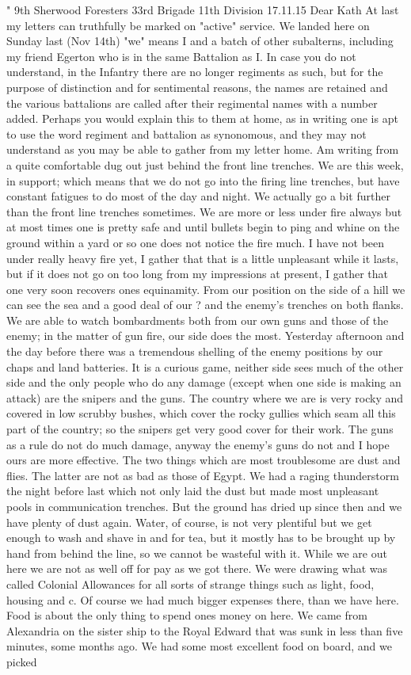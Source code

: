 " 9th Sherwood Foresters
    33rd Brigade
    11th Division 17.11.15
Dear Kath
    At last my letters can truthfully be marked on "active" service. We landed here on Sunday last (Nov 14th) "we" means I and a batch of other subalterns, including my friend Egerton who is in the same Battalion as I. In case you do not understand, in the Infantry there are no longer regiments as such, but for the purpose of distinction and for sentimental reasons, the names are retained and the various battalions are called after their regimental names with a number added. Perhaps you would explain this to them at home, as in writing one is apt to use the word regiment and battalion as synonomous, and they may not understand as you may be able to gather from my letter home. Am writing from a quite comfortable dug out just behind the front line trenches. We are this week, in support; which means that we do not go into the firing line trenches, but have constant fatigues to do most of the day and night. We actually go a bit further than the front line trenches sometimes. We are more or less under fire always but at most times one is pretty safe and until bullets begin to ping and whine on the ground within a yard or so one does not notice the fire much. I have not been under really heavy fire yet, I gather that that is a little unpleasant while it lasts, but if it does not go on too long from my impressions at present, I gather that one very soon recovers ones equinamity. From our position on the side of a hill we can see the sea and a good deal of our ? and the enemy's trenches on both flanks. We are able to watch bombardments both from our own guns and those of the enemy; in the matter of gun fire, our side does the most. Yesterday afternoon and the day before there was a tremendous shelling of the enemy positions by our chaps and land batteries. It is a curious game, neither side sees much of the other side and the only people who do any damage (except when one side is making an attack) are the snipers and the guns. The country where we are is very rocky and covered in low scrubby bushes, which cover the rocky gullies which seam all this part of the country; so the snipers get very good cover for their work. The guns as a rule do not do much damage, anyway the enemy's guns do not and I hope ours are more effective. The two things which are most troublesome are dust and flies. The latter are not as bad as those of Egypt. We had a raging thunderstorm the night before last which not only laid the dust but made most unpleasant pools in communication trenches. But the ground has dried up since then and we have plenty of dust again. Water, of course, is not very plentiful but we get enough to wash and shave in and for tea, but it mostly has to be brought up by hand from behind the line, so we cannot be wasteful with it. While we are out here we are not as well off for pay as we got there. We were drawing what was called Colonial Allowances for all sorts of strange things such as light, food, housing and c. Of course we had much bigger expenses there, than we have here. Food is about the only thing to spend ones money on here. We came from Alexandria on the sister ship to the Royal Edward that was sunk in less than five minutes, some months ago. We had some most excellent food on board, and we picked 